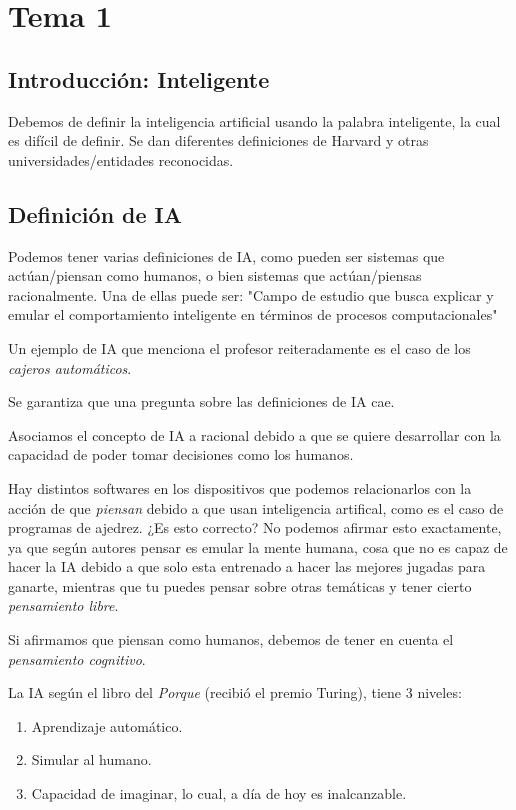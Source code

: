 \section{Tema 1}

\subsection{Introducción: Inteligente}
Debemos de definir la inteligencia artificial
usando la palabra inteligente, la cual es difícil de definir. Se dan diferentes definiciones de Harvard y otras universidades/entidades reconocidas. 

\subsection{Definición de IA}

Podemos tener varias definiciones de IA, como pueden ser sistemas que actúan/piensan como humanos, o bien sistemas que actúan/piensas racionalmente. Una de ellas puede ser: "Campo de estudio que busca explicar y emular el comportamiento inteligente en términos de procesos computacionales"

Un ejemplo de IA que menciona el profesor reiteradamente es el caso de los \textit{cajeros automáticos}.

\begin{tcolorbox}[colback=blue!20, colframe=blue]
Se garantiza que una pregunta sobre las definiciones de IA cae.
    
\end{tcolorbox}

Asociamos el concepto de IA a racional debido a que se quiere desarrollar con la capacidad de poder tomar decisiones como los humanos.

Hay distintos softwares en los dispositivos que podemos relacionarlos con la acción de que \textit{piensan} debido a que usan inteligencia artifical, como es el caso de programas de ajedrez. ¿Es esto correcto? No podemos afirmar esto exactamente, ya que según autores pensar es emular la mente humana, cosa que no es capaz de hacer la IA debido a que solo esta entrenado a hacer las mejores jugadas para ganarte, mientras que tu puedes pensar sobre otras temáticas y tener cierto \textit{pensamiento libre}.

Si afirmamos que piensan como humanos, debemos de tener en cuenta el \textit{pensamiento cognitivo}.

La IA según el libro del \textit{Porque} (recibió el premio Turing), tiene 3 niveles:
\begin{enumerate}
    \item Aprendizaje automático.
    \item Simular al humano.
    \item Capacidad de imaginar, lo cual, a día de hoy es inalcanzable.
\end{enumerate}

